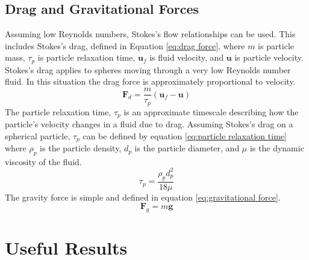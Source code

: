 \documentclass[10pt,a4paper,titlepage]{report}
\begin{document}
\subsection{Drag and Gravitational Forces}
\label{sec:drag and gravity}
Assuming low Reynolds numbers, Stokes's flow relationships can be used. This includes Stokes's drag, defined in Equation \ref{eq:drag force}, where $m$ is particle mass, $\tau_p$ is particle relaxation time, $\mathbf{u}_f$ is fluid velocity, and $\mathbf{u}$ is particle velocity. Stokes's drag applies to spheres moving through a very low Reynolds number fluid. In this situation the drag force is approximately proportional to velocity.
\begin{equation}
\label{eq:drag force}
\mathbf{F}_{d} = \dfrac{m}{\tau_p} (\mathbf{u}_f - \mathbf{u})
\end{equation}
The particle relaxation time, $\tau_p$ is an approximate timescale describing how the particle's velocity changes in a fluid due to drag. Assuming Stokes's drag on a spherical particle, $\tau_p$ can be defined by equation \ref{eq:particle relaxation time} where $\rho_p$ is the particle density, $d_p$ is the particle diameter, and $\mu$ is the dynamic viscosity of the fluid.
\begin{equation}
\label{eq:particle relaxation time}
\tau_{p} = \dfrac{\rho_{p} d^{2}_{p}}{18 \mu}
\end{equation}
The gravity force is simple and defined in equation \ref{eq:gravitational force}.
\begin{equation}
\label{eq:gravitational force}
\mathbf{F}_{g} = m \mathbf{g}
\end{equation}
\section{Useful Results}
\end{document}
